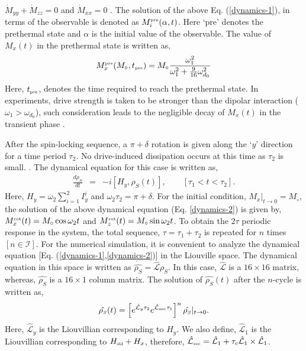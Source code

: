 \documentclass[prl,aps,preprint,floatfix]{revtex4-2}
\newcommand{\rh}{\rho_{\scriptscriptstyle  S}}
\newcommand{\stoo}{\vert_{t\rightarrow 0}}
\begin{document}
$\dot{M}_{yy}+\dot{M}_{zz} =0$ and $\dot{M}_{xx} = 0$ \cite{saha_cascaded_2023}. The solution of the above Eq. (\ref{dynamics-1}), in terms of the observable is denoted as $M_i^{\scriptscriptstyle \rm pre}(\alpha, t)$. Here `pre' denotes the prethermal state and $\alpha$ is the initial value of the observable.  The value of $M_x(t)$ in the prethermal state is written as, 
\begin{eqnarray}
M_x^{\scriptscriptstyle \rm pre}(M_\circ,t_{\scriptscriptstyle \rm pre})  = M_\circ \frac{\omega_1^2}{\omega_1^2 + \frac{9}{16}\omega_{d_0}^2}
\label{mxpre}
\end{eqnarray}
Here, $t_{\scriptscriptstyle \rm pre}$, denotes the time required to reach the prethermal state.
In experiments, drive strength is taken to be stronger than the dipolar interaction ($\omega_1 > \omega_{d_0}$), such consideration leads to the negligible decay of $M_x(t)$ in the transient phase \cite{choi_observation_2017}. 

After the spin-locking sequence, a $\pi+ \delta$ rotation is given along the `$y$' direction for a time period $\tau_2$. No drive-induced dissipation occurs at this time as $\tau_2$ is small. \cite{beatrez_critical_2023}. The dynamical equation for this case is written as,
\begin{eqnarray}\label{dynamics-2}
\frac{d\rh}{dt}&=& -i\left[H_y, \rh(t)\right], \qquad [\tau_1<t<\tau_2].
\end{eqnarray}
Here, $H_y = \omega_2 \sum_{i=1}^2 I_y^i$ and $\omega_2\tau_2 = \pi + \delta$. For the initial condition, $M_x \stoo = M_\circ$, the solution of the above dynamical equation (Eq. \ref{dynamics-2}) is given by, $M_x^{\scriptscriptstyle \rm rot} (t) = M_\circ \cos \omega_2 t$ and $M_z^{\scriptscriptstyle \rm rot} (t) = M_\circ \sin \omega_2 t$. To obtain the $2\tau$ periodic response in the system, the total sequence, $\tau = \tau_1 + \tau_2$ is repeated for $n$ times $[n \in \mathcal{I}]$. For the numerical simulation, it is convenient to analyze the dynamical equation [Eq. (\ref{dynamics-1},\ref{dynamics-2})] in the Liouville space. The dynamical equation in this space is written as $\dot{\hat{\rh}}= \hat{\mathcal{L}}\hat{\rh}$. In this case, $\hat{\mathcal{L}}$ is a $16 \times 16$ matrix, whereas, $\hat{\rh}$ is a $16 \times 1$ column matrix. The solution of $\hat{\rh}(t)$ after the $n$-cycle is written as,
\begin{eqnarray}\label{main-eq}
\hat{\rh}(t) =\left[e^{\hat{\mathcal{L}}_y  \tau_2} e^{\hat{\mathcal{L}}_{\scriptscriptstyle \rm sec}  \tau_1}\right]^n \hat{\rh} \stoo.
\end{eqnarray}
Here, $\hat{\mathcal{L}}_y$ is the Liouvillian corresponding to $H_y$. We also define, $\hat{\mathcal{L}}_1$  is the Liouvillian corresponding to $H_{\scriptscriptstyle \rm dd} + H_x$, therefore, $\hat{\mathcal{L}}_{\scriptscriptstyle \rm sec} = \hat{\mathcal{L}}_1 + \tau_c \hat{\mathcal{L}}_1 \times\hat{\mathcal{L}}_1 $.
\end{document}
